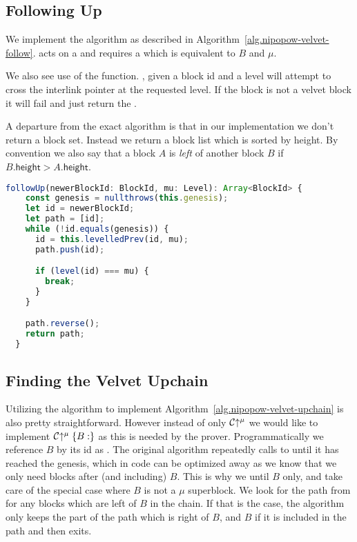 \subsection{Following Up}
We implement the  algorithm as described in Algorithm~\ref{alg.nipopow-velvet-follow}.  acts on a  and requires a  which is equivalent to $B$ and $\mu$.

We also see use of the  function. , given a block id and a level will attempt to cross the interlink pointer at the requested level. If the block is not a velvet block it will fail and just return the .

A departure from the exact algorithm is that in our implementation we don't return a block set. Instead we return a block list which is sorted by height. By convention we also say that a block $A$ is \textit{left} of another block $B$ if $B.\mathsf{height} > A.\mathsf{height}$.

\begin{lstlisting}[language=Javascript]
  followUp(newerBlockId: BlockId, mu: Level): Array<BlockId> {
    const genesis = nullthrows(this.genesis);
    let id = newerBlockId;
    let path = [id];
    while (!id.equals(genesis)) {
      id = this.levelledPrev(id, mu);
      path.push(id);

      if (level(id) === mu) {
        break;
      }
    }

    path.reverse();
    return path;
  }
\end{lstlisting}

\subsection{Finding the Velvet Upchain}
Utilizing the  algorithm to implement Algorithm~\ref{alg.nipopow-velvet-upchain} is also pretty straightforward. However instead of only $\mathcal{C} \negthickspace\uparrow^\mu$ we would like to implement $\mathcal{C}\negthickspace\uparrow^\mu\{B:\}$ as this is needed by the prover. Programmatically we reference $B$ by its id as  . The original algorithm repeatedly calls to  until it has reached the genesis, which in code can be optimized away as we know that we only need blocks after (and including) $B$. This is why we  until $B$ only, and take care of the special case where $B$ is not a $\mu$ superblock. We look for the path from  for any blocks which are left of $B$ in the chain. If that is the case, the algorithm only keeps the part of the path which is right of $B$, and $B$ if it is included in the path and then exits.

